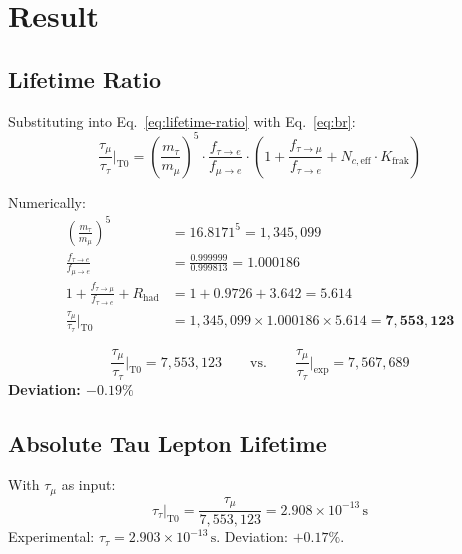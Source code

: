 	
	\section{Result}
	
	\subsection{Lifetime Ratio}
	
	Substituting into Eq.~\eqref{eq:lifetime-ratio} with Eq.~\eqref{eq:br}:
	\begin{equation}
		\frac{\tau_\mu}{\tau_\tau}\bigg|_\text{T0} = \left(\frac{m_\tau}{m_\mu}\right)^5 \cdot \frac{f_{\tau \to e}}{f_{\mu \to e}} \cdot \left(1 + \frac{f_{\tau \to \mu}}{f_{\tau \to e}} + N_{c,\text{eff}} \cdot K_\text{frak}\right)
	\end{equation}
	
	Numerically:
	\begin{align}
		\left(\frac{m_\tau}{m_\mu}\right)^5 &= 16.8171^5 = 1{,}345{,}099 \\
		\frac{f_{\tau \to e}}{f_{\mu \to e}} &= \frac{0.999999}{0.999813} = 1.000186 \\
		1 + \frac{f_{\tau \to \mu}}{f_{\tau \to e}} + R_\text{had} &= 1 + 0.9726 + 3.642 = 5.614 \\[6pt]
		\frac{\tau_\mu}{\tau_\tau}\bigg|_\text{T0} &= 1{,}345{,}099 \times 1.000186 \times 5.614 = \mathbf{7{,}553{,}123}
	\end{align}
	
	\begin{keypoint}
		\begin{equation}
			\frac{\tau_\mu}{\tau_\tau}\bigg|_\text{T0} = 7{,}553{,}123 \qquad \text{vs.} \qquad \frac{\tau_\mu}{\tau_\tau}\bigg|_\text{exp} = 7{,}567{,}689
		\end{equation}
		\textbf{Deviation: $-0.19\%$}
	\end{keypoint}
	
	\subsection{Absolute Tau Lepton Lifetime}
	
	With $\tau_\mu$ as input:
	\begin{equation}
		\tau_\tau\big|_\text{T0} = \frac{\tau_\mu}{7{,}553{,}123} = 2.908 \times 10^{-13} \, \text{s}
	\end{equation}
	Experimental: $\tau_\tau = 2.903 \times 10^{-13} \, \text{s}$. Deviation: $+0.17\%$.
	
